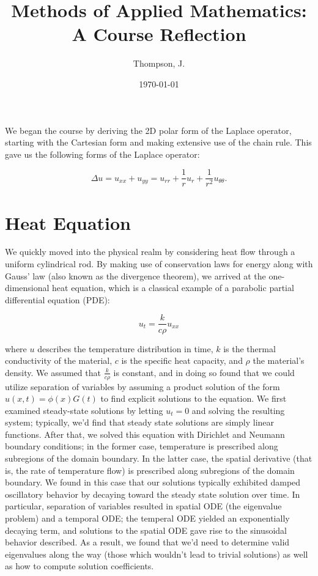 \documentclass[letterpaper,10pt]{article}
\begin{document}
    \title{
        Methods of Applied Mathematics: A Course Reflection\\
    }
    \author{%
        Thompson, J.
    }
    \date{\today}
    \maketitle

    We began the course by deriving the 2D polar form of the Laplace operator, starting with the Cartesian form and 
    making extensive use of the chain rule. This gave us the following forms of the Laplace operator:

    $$
    \Delta u = u_{xx} + u_{yy} = u_{rr} + \frac{1}{r} u_{r} + \frac{1}{r^2} u_{\theta\theta}.
    $$

    \section{Heat Equation}\label{sec:heat-equation}
    We quickly moved into the physical realm by considering heat flow through a uniform cylindrical rod. By making use
    of conservation laws for energy along with Gauss' law (also known as the divergence theorem), we arrived at the 
    one-dimensional heat equation, which is a classical example of a parabolic partial differential equation (PDE):

    $$
    u_{t} = \frac{k}{c \rho} u_{xx}
    $$

    \noindent where $u$ describes the temperature distribution in time, $k$ is the thermal conductivity of the material,
    $c$ is the specific heat capacity, and $\rho$ the material's density. We assumed that $\frac{k}{c \rho}$ is 
    constant, and in doing so found that we could utilize separation of variables by assuming a product solution of the
    form $u(x, t) = \phi(x) G(t)$ to find explicit solutions to the equation. We first examined steady-state solutions
    by letting $u_t = 0$ and solving the resulting system; typically, we'd find that steady state solutions are simply 
    linear functions. After that, we solved this equation with Dirichlet and Neumann boundary conditions; in the former
    case, temperature is prescribed along subregions of the domain boundary. In the latter case, the spatial derivative
    (that is, the rate of temperature flow) is prescribed along subregions of the domain boundary. We found in this case
    that our solutions typically exhibited damped oscillatory behavior by decaying toward the steady state solution over 
    time. In particular, separation of variables resulted in spatial ODE (the eigenvalue problem) and a temporal ODE; 
    the temperal ODE yielded an exponentially decaying term, and solutions to the spatial ODE gave rise to the 
    sinusoidal behavior described. As a result, we found that we'd need to determine valid eigenvalues along the way 
    (those which wouldn't lead to trivial solutions) as well as how to compute solution coefficients.
    
\end{document}
